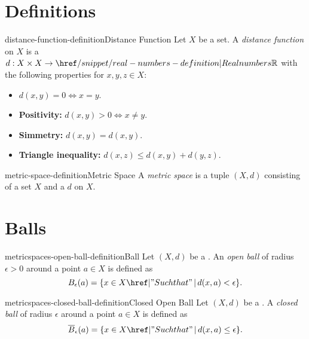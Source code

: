 \documentclass[preview]{standalone}
\begin{document}
\genpage

\section{Definitions}

\begin{snippetdefinition}{distance-function-definition}{Distance Function}
    Let \(X\) be a set.
    A \textit{distance function} on \(X\) is
    a \function \(d: X \times X \to \realnumbers\)
    with the following properties for \(x,y,z \in X\):
    \begin{itemize}
        \item \(d(x,y) = 0 \iff x = y\).
        \item \textbf{Positivity:} \(d(x,y) > 0 \iff x \neq y\).
        \item \textbf{Simmetry:} \(d(x,y) = d(x,y)\).
        \item \textbf{Triangle inequality:} \(d(x,z) \leq d(x,y) + d(y,z)\).
    \end{itemize}
\end{snippetdefinition}

\begin{snippetdefinition}{metric-space-definition}{Metric Space}
    A \textit{metric space} is a tuple \((X, d)\)
    consisting of a set \(X\) and a \distancefunction \(d\) on \(X\).
\end{snippetdefinition}



\section{Balls}

\begin{snippetdefinition}{metricspaces-open-ball-definition}{Ball}
    Let \((X, d)\) be a \metricspace.
    An \textit{open ball} of radius \(\epsilon > 0\) around a point
    \(a \in X\) is defined as
    \[
        B_\epsilon(a) = \{x \in X \suchthat d(x,a) < \epsilon\}.
    \]
\end{snippetdefinition}

\begin{snippetdefinition}{metricspaces-closed-ball-definition}{Closed Open Ball}
    Let \((X, d)\) be a \metricspace.
    A \textit{closed ball} of radius \(\epsilon\) around a point
    \(a \in X\) is defined as
    \[
        \overline{B}_\epsilon(a) = \{x \in X \suchthat d(x,a) \leq \epsilon\}.
    \]
\end{snippetdefinition}
\end{document}
